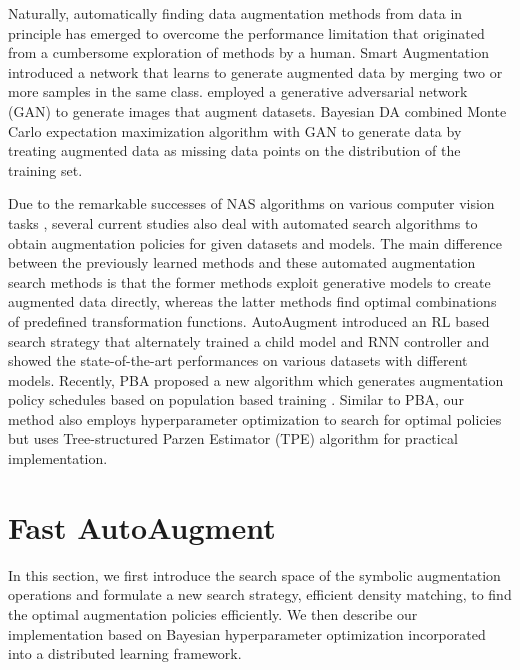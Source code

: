 \documentclass{article}
\begin{document}
Naturally, automatically finding data augmentation methods from data in principle has emerged to overcome the performance limitation that originated from a cumbersome exploration of methods by a human. Smart Augmentation \cite{lemley2017smart} introduced a network that learns to generate augmented data by merging two or more samples in the same class. \cite{shrivastava2017learning} employed a generative adversarial network (GAN) \cite{goodfellow2014generative} to generate images that augment datasets. Bayesian DA \cite{tran2017bayesian} combined Monte Carlo expectation maximization algorithm with GAN to generate data by treating augmented data as missing data points on the distribution of the training set. 

Due to the remarkable successes of NAS algorithms on various computer vision tasks \cite{real2018regularized, zoph2018learning, kim2018scalable}, several current studies also deal with automated search algorithms to obtain augmentation policies for given datasets and models. The main difference between the previously learned methods and these automated augmentation search methods is that the former methods exploit generative models to create augmented data directly, whereas the latter methods find optimal combinations of predefined transformation functions. AutoAugment \cite{cubuk2018autoaugment} introduced an RL based search strategy that alternately trained a child model and RNN controller and showed the state-of-the-art performances on various datasets with different models. Recently, PBA \cite{ho2019pba} proposed a new algorithm which generates augmentation policy schedules based on population based training \cite{jaderberg2017population}. Similar to PBA, our method also employs hyperparameter optimization to search for optimal policies but uses Tree-structured Parzen Estimator (TPE) algorithm \cite{bergstra2011algorithms} for practical implementation.




\section{Fast AutoAugment}
\label{sec:faa}

In this section, we first introduce the search space of the symbolic augmentation operations and formulate a new search strategy, efficient density matching, to find the optimal augmentation policies efficiently. We then describe our implementation based on Bayesian hyperparameter optimization incorporated into a distributed learning framework.
\end{document}
